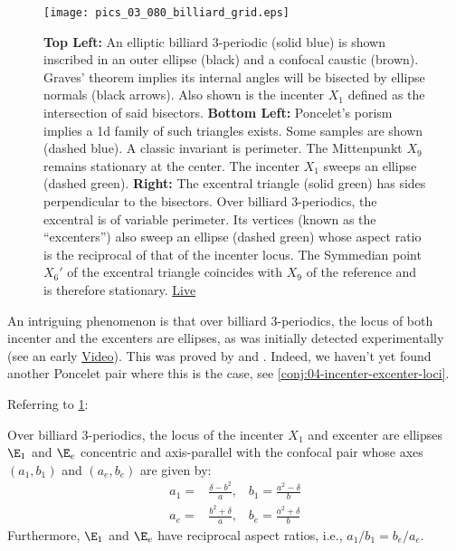 \begin{figure}
    \centering
    \texttt{[image: pics\_03\_080\_billiard\_grid.eps]}
    \caption{\textbf{Top Left:} An elliptic billiard 3-periodic (solid blue) is shown inscribed in an outer ellipse (black) and a confocal caustic (brown). Graves' theorem implies its internal angles will be bisected by ellipse normals (black arrows). Also shown is the incenter $X_1$ defined as the intersection of said bisectors. \textbf{Bottom Left:} Poncelet's porism implies a 1d family of such triangles exists. Some samples are shown (dashed blue). A classic invariant is  perimeter. The Mittenpunkt $X_9$ remains stationary at the center. The incenter $X_1$ sweeps an ellipse (dashed green). \textbf{Right:} The excentral triangle (solid green) has sides perpendicular to the bisectors. Over billiard 3-periodics, the excentral is of variable perimeter. Its vertices (known as the ``excenters'') also sweep an ellipse (dashed green) whose aspect ratio is the reciprocal of that of the incenter locus. The Symmedian point $X_6'$ of the excentral triangle coincides with $X_9$ of the reference and is therefore stationary. \href{https://bit.ly/3gWl3CI}{Live}}
    \label{fig:billiard-grid}
\end{figure}

An intriguing phenomenon is that over billiard 3-periodics, the locus of both incenter and the excenters are ellipses, as was initially detected experimentally (see an early \href{https://youtu.be/BBsyM7RnswA}{Video}). This was proved by \cite{olga14} and \cite{garcia2019-incenter}. Indeed, we haven't yet found another Poncelet pair where this is the case, see \cref{conj:04-incenter-excenter-loci}.

Referring to \cref{fig:billiard-grid}:

\begin{theorem}
Over billiard 3-periodics, the locus of the incenter $X_1$ and excenter are ellipses $\E_1$ and $\E_e$ concentric and axis-parallel with the confocal pair whose axes $(a_1,b_1)$ and $(a_e,b_e)$ are given by:
\begin{align*}
a_1 =& \frac{\delta-b^2 }{a},\;\;\;b_1=\frac{a^2-\delta}{b}\\ 
a_e= &\frac{{b}^{2}+\delta}{a},\;\;\;b_e=\frac{{a}^{2}+\delta}{b}
\end{align*}
Furthermore, $\E_1$ and $\E_e$ have reciprocal aspect ratios, i.e., $a_1/b_1=b_e/a_e$.
\label{thm:03-incenter-excenter}
\end{theorem}

